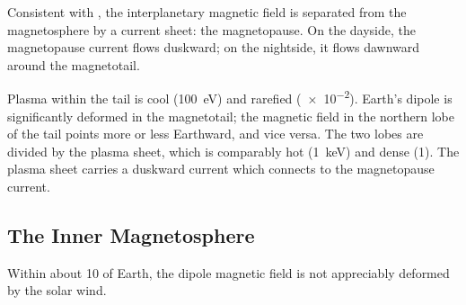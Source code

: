 Consistent with \amplaw, the interplanetary magnetic field is separated from the magnetosphere by a current sheet: the magnetopause. On the dayside, the magnetopause current flows duskward; on the nightside, it flows dawnward around the magnetotail. 

Plasma within the tail is cool (\about\SI{100}{\eV}) and rarefied (\about\SI{e-2}{\percc}). Earth's dipole is significantly deformed in the magnetotail; the magnetic field in the northern lobe of the tail points more or less Earthward, and vice versa. The two lobes are divided by the plasma sheet, which is comparably hot (\about\SI{1}{\keV}) and dense (\about\SI{1}{\percc}). The plasma sheet carries a duskward current which connects to the magnetopause current. 






\subsection{The Inner Magnetosphere}

Within about \SI{10}{\RE} of Earth, the dipole magnetic field is not appreciably deformed by the solar wind. 


